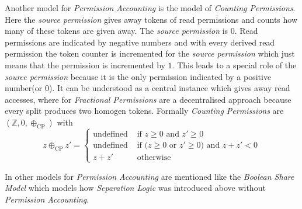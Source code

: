 	Another model for \emph{Permission Accounting} is the model of
	\emph{Counting Permissions}. Here the \emph{source permission} gives away
	tokens of read permissions and counts how many of these tokens are given
	away. The \emph{source permission} is $0$. Read permissions are indicated
	by negative numbers and with every derived read permission the token counter
	is incremented for the \emph{source permission} which just means that the
	permission is incremented by $1$. This leads to a special role of the
	\emph{source permission} because it is the only permission indicated by
	a positive number(or $0$). It can be understood as a central instance which
	gives away read accesses, where for \emph{Fractional Permissions} are a
	decentralised approach because every split produces two homogen
	tokens. Formally \emph{Counting Permissions} are
	$(\mathbb{Z},0,\oplus_\text{CP})$ with
	$$z \oplus_\text{CP} z' =
		\begin{cases}
			\text{undefined} & \text{ if $z \geq 0$ and $z' \geq 0$}\\
			\text{undefined} & \text{ if ($z\geq 0$ or  $z' \geq 0$) and $z + z' < 0$}\\
			z + z'           & \text{ otherwise}
		\end{cases}
	$$

	In \cite{freshlook} other models for \emph{Permission Accounting} are
	mentioned like the \emph{Boolean Share Model} which models how
	\emph{Separation Logic} was introduced above without
	\emph{Permission Accounting}.

